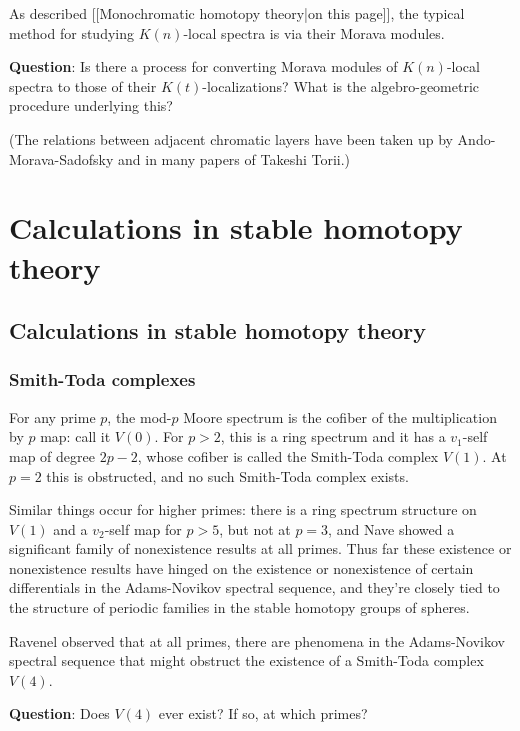 \documentclass[12pt,titlepage]{article}
\newcommand{\gt}{>}
\theoremstyle{plain}
\theoremstyle{definition}
\theoremstyle{remark}
\begin{document}
As described [[Monochromatic homotopy theory|on this page]], the typical method for studying $K(n)$-local spectra is via their Morava modules.

\textbf{Question}: Is there a process for converting Morava modules of $K(n)$-local spectra to those of their $K(t)$-localizations? What is the algebro-geometric procedure underlying this?

(The relations between adjacent chromatic layers have been taken up by Ando-Morava-Sadofsky and in many papers of Takeshi Torii.)

\section{Calculations in stable homotopy theory}

\hypertarget{calculations_in_stable_homotopy_theory_1}{}\subsection{{Calculations in stable homotopy theory}}\label{calculations_in_stable_homotopy_theory_1}

\hypertarget{smithtoda_complexes_2}{}\subsubsection{{Smith-Toda complexes}}\label{smithtoda_complexes_2}

For any prime $p$, the mod-$p$ Moore spectrum is the cofiber of the multiplication by $p$ map: call it $V(0)$. For $p \gt 2$, this is a ring spectrum and it has a $v_1$-self map of degree $2p-2$, whose cofiber is called the Smith-Toda complex $V(1)$. At $p=2$ this is obstructed, and no such Smith-Toda complex exists.

Similar things occur for higher primes: there is a ring spectrum structure on $V(1)$ and a $v_2$-self map for $p \gt 5$, but not at $p=3$, and Nave showed a significant family of nonexistence results at all primes. Thus far these existence or nonexistence results have hinged on the existence or nonexistence of certain differentials in the Adams-Novikov spectral sequence, and they'{}re closely tied to the structure of periodic families in the stable homotopy groups of spheres.

Ravenel observed that at all primes, there are phenomena in the Adams-Novikov spectral sequence that might obstruct the existence of a Smith-Toda complex $V(4)$.

\textbf{Question}: Does $V(4)$ ever exist? If so, at which primes?
\end{document}
